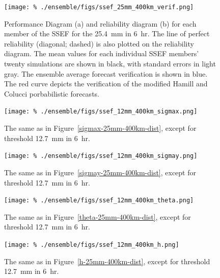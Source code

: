\clearpage
\begin{figure}[cc]
    \centering
    \texttt{[image: \%
    ./ensemble/figs/ssef\_25mm\_400km\_verif.png]}\\
    \caption{Performance Diagram (a) and reliability diagram (b) for each member of the SSEF for the \mbox{25.4 mm} in \mbox{6 hr}.
    The line of perfect reliability (diagonal; dashed) is also plotted on the reliability diagram.
    The mean values for each individual SSEF members' twenty simulations are shown in black, with standard errors in light gray.
    The ensemble average forecast verification is shown in blue.
    The red curve depicts the verification of the modified Hamill and Colucci porbabilistic forecasts.
    }
    \label{ssef-25mm-400km-verif}
\end{figure}




\clearpage
\begin{figure}[cc]
    \centering
    \texttt{[image: \%
    ./ensemble/figs/ssef\_12mm\_400km\_sigmax.png]}\\
    \caption{The same as in \mbox{Figure \ref{sigmax-25mm-400km-dist}}, except for threshold \mbox{12.7 mm} in \mbox{6 hr}.}
    \label{sigmax-12mm-400km-dist}
\end{figure}


\clearpage
\begin{figure}[cc]
    \centering
    \texttt{[image: \%
    ./ensemble/figs/ssef\_12mm\_400km\_sigmay.png]}\\
    \caption{The same as in \mbox{Figure \ref{sigmay-25mm-400km-dist}}, except for threshold \mbox{12.7 mm} in \mbox{6 hr}.}
    \label{sigmay-12mm-400km-dist}
\end{figure}


\clearpage
\begin{figure}[cc]
    \centering
    \texttt{[image: \%
    ./ensemble/figs/ssef\_12mm\_400km\_theta.png]}\\
    \caption{The same as in \mbox{Figure \ref{theta-25mm-400km-dist}}, except for threshold \mbox{12.7 mm} in \mbox{6 hr}.}
    \label{theta-12mm-400km-dist}
\end{figure}


\clearpage
\begin{figure}[cc]
    \centering
    \texttt{[image: \%
    ./ensemble/figs/ssef\_12mm\_400km\_h.png]}\\
    \caption{The same as in \mbox{Figure \ref{h-25mm-400km-dist}}, except for threshold \mbox{12.7 mm} in \mbox{6 hr}.}
    \label{h-12mm-400km-dist}
\end{figure}


